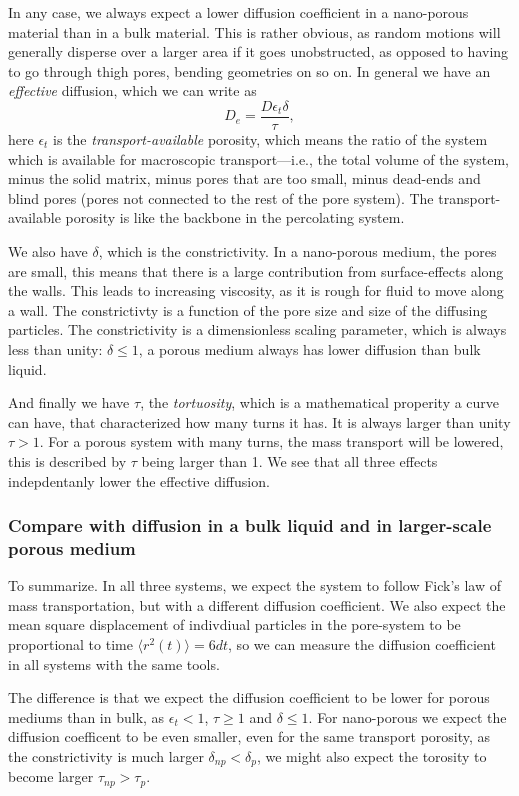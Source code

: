 \documentclass[a4paper, 11pt, notitlepage, english]{article}
\newcommand{\eps}{\epsilon}
\begin{document}
In any case, we always expect a lower diffusion coefficient in a nano-porous material than in a bulk material. This is rather obvious, as random motions will generally disperse over a larger area if it goes unobstructed, as opposed to having to go through thigh pores, bending geometries on so on. In general we have an \emph{effective} diffusion, which we can write as
$$D_e = \frac{D \eps_t \delta}{\tau},$$
here $\eps_t$ is the \emph{transport-available} porosity, which means the ratio of the system which is available for macroscopic transport---i.e., the total volume of the system, minus the solid matrix, minus pores that are too small, minus dead-ends and blind pores (pores not connected to the rest of the pore system). The transport-available porosity is like the backbone in the percolating system. 

We also have $\delta$, which is the constrictivity. In a nano-porous medium, the pores are small, this means that there is a large contribution from surface-effects along the walls. This leads to increasing viscosity, as it is rough for fluid to move along a wall. The constrictivty is a function of the pore size and size of the diffusing particles. The constrictivity is a dimensionless scaling parameter, which is always less than unity: $\delta \leq 1$, a porous medium always has lower diffusion than bulk liquid.

And finally we have $\tau$, the \emph{tortuosity}, which is a mathematical properity a curve can have, that characterized how many turns it has. It is always larger than unity $\tau > 1$. For a porous system with many turns, the mass transport will be lowered, this is described by $\tau$ being larger than 1. We see that all three effects indepdentanly lower the effective diffusion.

\subsubsection*{Compare with diffusion in a bulk liquid and in larger-scale porous medium}

To summarize. In all three systems, we expect the system to follow Fick's law of mass transportation, but with a different diffusion coefficient. We also expect the mean square displacement of indivdiual particles in the pore-system to be proportional to time $\langle r^2 (t) \rangle = 6dt$, so we can measure the diffusion coefficient in all systems with the same tools.

The difference is that we expect the diffusion coefficient to be lower for porous mediums than in bulk, as $\eps_t < 1$, $\tau \geq 1$ and $\delta \leq 1$. For nano-porous we expect the diffusion coefficent to be even smaller, even for the same transport porosity, as the constrictivity is much larger $\delta_{np} < \delta_{p}$, we might also expect the torosity to become larger $\tau_{np} > \tau_{p}$.
\end{document}
